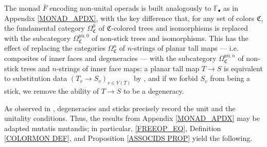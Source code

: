 \documentclass[a4paper,10pt
,draft
]{article}%
\renewcommand{\1}{\eta}%
\begin{document}
The monad $\bar F$ encoding non-unital operads is built analogously to $\mathbb F_\bullet$ as in Appendix \ref{MONAD_APDX},
with the key difference that,
for any set of colors $\mathfrak C$,
the fundamental category $\Omega_{\mathfrak C}^0$ of $\mathfrak C$-colored trees and isomorphisms
is replaced with the subcategory $\Omega_{\mathfrak C}^{\textrm{nu},0}$ of non-stick trees and isomorphisms.
This has the effect of replacing the categories $\Omega_{\mathfrak C}^n$ of $n$-strings of planar tall maps --- i.e. composites of inner faces and degeneracies --- 
with the subcategory $\Omega_{\mathfrak C}^{\textrm{nu},n}$ of
non-stick trees and $n$-strings of inner face maps:
a planar tall map $T \to S$ is equivalent to substitution data $(T_v \to S_v)_{v \in V(T)}$ by \cite[Prop. 3.41]{BP_geo},
and if we forbid $S_v$ from being a stick,
we remove the ability of $T \to S$ to be a degeneracy.

As observed in \cite{BP_geo}, degeneracies and sticks precisely record the unit and the unitality conditions.
Thus, the results from Appendix \ref{MONAD_APDX} may be adapted mutatis mutandis;
in particular, \eqref{FREEOP_EQ}, Definition \ref{COLORMON DEF}, and Proposition \ref{ASSOCIDS PROP} yield the following.
\end{document}
